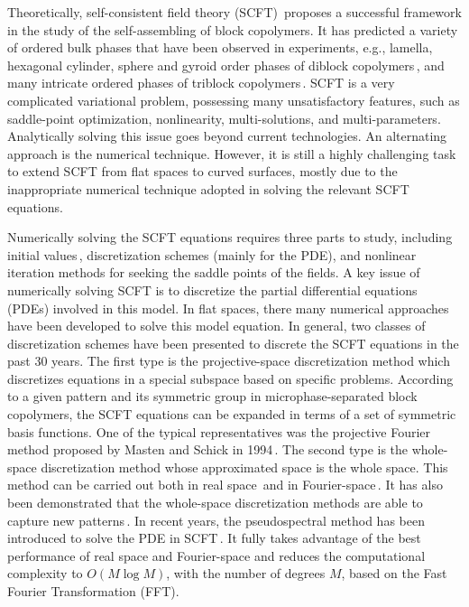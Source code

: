 \documentclass[final,1p,times]{elsarticle}
\begin{document}
Theoretically, self-consistent field theory
(SCFT)\,\cite{fredrickson2006equilibrium} proposes a successful framework in
the study of the self-assembling of block copolymers.  It has predicted a
variety of ordered bulk phases that have been observed in experiments, e.g.,
lamella, hexagonal cylinder, sphere and gyroid order phases of diblock
copolymers\,\cite{matsen1994stable}, and many intricate ordered phases of
triblock copolymers\,\cite{jiang2015self}.  SCFT is a very complicated
variational problem, possessing many unsatisfactory features, such as
saddle-point optimization, nonlinearity, multi-solutions, and multi-parameters.
Analytically solving this issue goes beyond current technologies. An alternating
approach is the numerical technique.  However, it is still a highly challenging
task to extend SCFT from flat spaces to curved surfaces, mostly due to the
inappropriate numerical technique adopted in solving the relevant SCFT
equations.

Numerically solving the SCFT equations requires three parts to study, including
initial values\,\cite{xu2013strategy, jiang2010spectral, jiang2013discovery},
discretization schemes (mainly for the PDE), and
nonlinear iteration methods for seeking the saddle points of the fields.
A key issue of numerically solving SCFT is to discretize the partial
differential equations (PDEs) involved in this model. In flat spaces, there many numerical
approaches have been developed to solve this model  equation.  In general, two
classes of discretization schemes have been presented to discrete the SCFT
equations in the past 30 years.  The first type is the projective-space
discretization method which discretizes equations in a special subspace based
on specific problems.  According to a given pattern and its symmetric group in
microphase-separated block copolymers, the SCFT equations can be expanded in
terms of a set of symmetric basis functions. One of the typical representatives
was the projective Fourier method proposed by Masten and Schick in
1994\,\cite{matsen1994stable}.  The second type is the whole-space
discretization method whose approximated space is the whole space. This method
can be carried out both in real space\,\cite{drolet1999combinatorial} and in
Fourier-space\,\cite{guo2008discovering}.  It has also been demonstrated that
the whole-space discretization methods are able to capture new
patterns\,\cite{drolet1999combinatorial, guo2008discovering}.  In recent years,
the pseudospectral method has been introduced to solve the PDE in
SCFT\,\cite{rasmussen2002improved, cochran2006stability}.  It fully takes
advantage of the best performance of real space and Fourier-space and reduces
the computational complexity to $O(M\log M)$, with the number of degrees $M$,
based on the Fast Fourier Transformation (FFT). 
\end{document}

